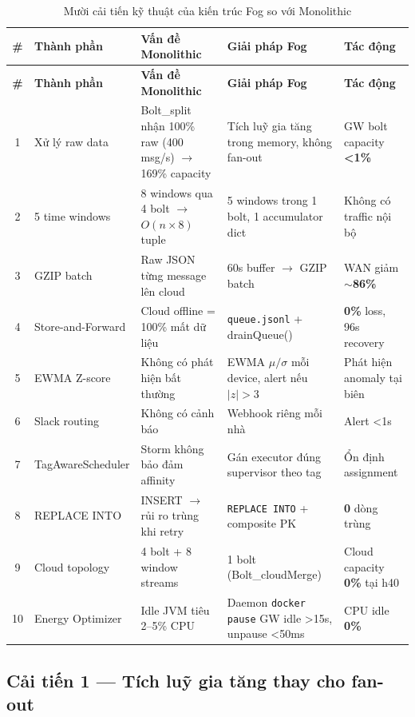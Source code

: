 \documentclass[13pt,a4paper]{report}
\newcommand{\code}[1]{\texttt{\small #1}}
\begin{document}
{\scriptsize
\renewcommand{\arraystretch}{1.25}
\begin{longtable}{c p{} p{} p{} p{}}
\caption{Mười cải tiến kỹ thuật của kiến trúc Fog so với Monolithic}
\label{tab:improvements}\\
\toprule
\textbf{\#} & \textbf{Thành phần} & \textbf{Vấn đề Monolithic} & \textbf{Giải pháp Fog} & \textbf{Tác động} \\
\midrule
\endfirsthead
\toprule
\textbf{\#} & \textbf{Thành phần} & \textbf{Vấn đề Monolithic} & \textbf{Giải pháp Fog} & \textbf{Tác động} \\
\midrule
\endhead
1  & Xử lý raw data & Bolt\_split nhận 100\% raw (400 msg/s) $\to$ 169\% capacity & Tích luỹ gia tăng trong memory, không fan-out & GW bolt capacity \textbf{\textless 1\%} \\
2  & 5 time windows & 8 windows qua 4 bolt $\to$ $O(n{\times}8)$ tuple & 5 windows trong 1 bolt, 1 accumulator dict & Không có traffic nội bộ \\
3  & GZIP batch & Raw JSON từng message lên cloud & 60s buffer $\to$ GZIP batch & WAN giảm \textbf{$\sim$86\%} \\
4  & Store-and-Forward & Cloud offline = 100\% mất dữ liệu & \code{queue.jsonl} + drainQueue() & \textbf{0\%} loss, 96s recovery \\
5  & EWMA Z-score & Không có phát hiện bất thường & EWMA $\mu/\sigma$ mỗi device, alert nếu $|z|>3$ & Phát hiện anomaly tại biên \\
6  & Slack routing & Không có cảnh báo & Webhook riêng mỗi nhà & Alert \textless 1s \\
7  & TagAwareScheduler & Storm không bảo đảm affinity & Gán executor đúng supervisor theo tag & Ổn định assignment \\
8  & REPLACE INTO & INSERT $\to$ rủi ro trùng khi retry & \code{REPLACE INTO} + composite PK & \textbf{0} dòng trùng \\
9  & Cloud topology & 4 bolt + 8 window streams & 1 bolt (Bolt\_cloudMerge) & Cloud capacity \textbf{0\%} tại h40 \\
10 & Energy Optimizer & Idle JVM tiêu 2--5\% CPU & Daemon \code{docker pause} GW idle \textgreater 15s, unpause \textless 50ms & CPU idle \textbf{0\%} \\
\bottomrule
\end{longtable}
\renewcommand{\arraystretch}{1.0}
}

\subsection{Cải tiến 1 --- Tích luỹ gia tăng thay cho fan-out}
\end{document}
